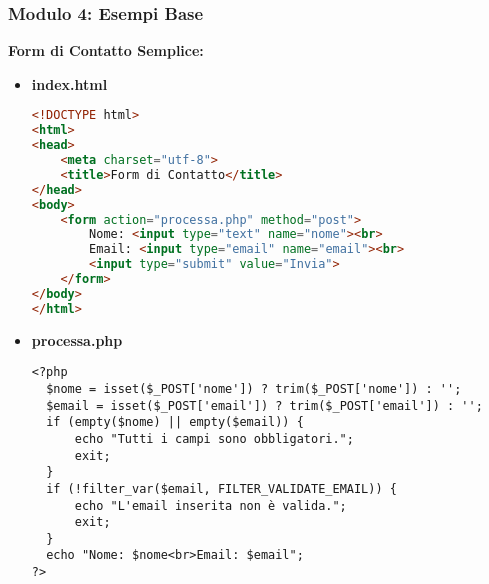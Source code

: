 \documentclass{beamer}
\begin{document}
\begin{frame}[fragile]
\frametitle{Modulo 4: Esempi Base}
\textbf{Form di Contatto Semplice:}
\begin{itemize}
    \item \textbf{index.html}
    \begin{lstlisting}[language=HTML]
<!DOCTYPE html>
<html>
<head>
    <meta charset="utf-8">
    <title>Form di Contatto</title>
</head>
<body>
    <form action="processa.php" method="post">
        Nome: <input type="text" name="nome"><br>
        Email: <input type="email" name="email"><br>
        <input type="submit" value="Invia">
    </form>
</body>
</html>
    \end{lstlisting}
    \item \textbf{processa.php}
    \begin{lstlisting}
<?php
  $nome = isset($_POST['nome']) ? trim($_POST['nome']) : '';
  $email = isset($_POST['email']) ? trim($_POST['email']) : '';
  if (empty($nome) || empty($email)) {
      echo "Tutti i campi sono obbligatori.";
      exit;
  }
  if (!filter_var($email, FILTER_VALIDATE_EMAIL)) {
      echo "L'email inserita non è valida.";
      exit;
  }
  echo "Nome: $nome<br>Email: $email";
?>
    \end{lstlisting}
\end{itemize}
\end{frame}
\end{document}
